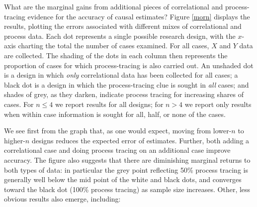 \documentclass[12pt,]{book}
\begin{document}
What are the marginal gains from additional pieces of correlational and process-tracing evidence for the accuracy of causal estimates? Figure \ref{morn} displays the results, plotting the errors associated with different mixes of correlational and process data. Each dot represents a single possible research design, with the \(x\)-axis charting the total the number of cases examined. For all cases, \(X\) and \(Y\) data are collected. The shading of the dots in each column then represents the proportion of cases for which process-tracing is also carried out. An unshaded dot is a design in which \emph{only} correlational data has been collected for all cases; a black dot is a design in which the process-tracing clue is sought in \emph{all} cases; and shades of grey, as they darken, indicate process tracing for increasing shares of cases. For \(n\leq 4\) we report results for all designs; for \(n>4\) we report only results when within case information is sought for all, half, or none of the cases.

We see first from the graph that, as one would expect, moving from lower-\(n\) to higher-\(n\) designs reduces the expected error of estimates. Further, both adding a correlational case and doing process tracing on an additional case improve accuracy. The figure also suggests that there are diminishing marginal returns to both types of data: in particular the grey point reflecting 50\% process tracing is generally well below the mid point of the white and black dots, and converges toward the black dot (100\% process tracing) as sample size increases. Other, less obvious results also emerge, including:
\end{document}

